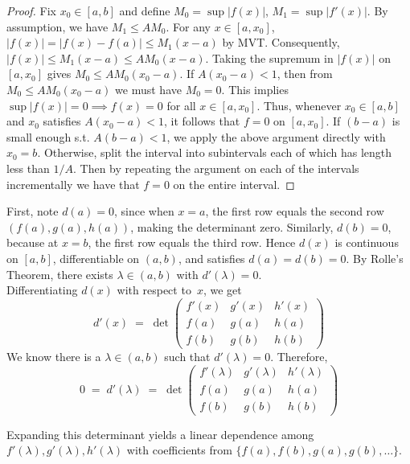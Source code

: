 \documentclass[11pt]{article}
\begin{document}
\begin{exercise}{5.26}
    \begin{proof}
        Fix $x_0 \in [a, b]$ and define $M_0 = \sup |f(x)|$, $M_1 = \sup |f'(x)|$. By assumption, we have $M_1 \le A M_0$. For any $x \in [a, x_0]$, $|f(x)| = |f(x) - f(a)| \le M_1(x - a)$ by MVT. Consequently, $|f(x)| \le M_1 (x - a) \le A M_0 (x - a)$. Taking the supremum in $|f(x)|$ on $[a, x_0]$ gives $M_0 \le AM_0 (x_0 - a)$. If $A(x_0 - a) < 1$, then from $M_0 \le A M_0(x_0 - a)$ we must have $M_0 = 0$. This implies $\sup |f(x)| = 0 \implies f(x) = 0$ for all $x \in [a, x_0]$. Thus, whenever $x_0 \in [a, b]$ and $x_0$ satisfies $A(x_0 - a) < 1$, it follows that $f = 0$ on $[a, x_0]$. If $(b -a)$ is small enough s.t. $A(b - a) < 1$, we apply the above argument directly with $x_0 = b$. Otherwise, split the interval into subintervals each of which has length less than $1/ A$. Then by repeating the argument on each of the intervals incrementally we have that $f = 0$ on the entire interval. 
    \end{proof}
\end{exercise}

\begin{exercise}{1}
    First, note $d(a)=0$, since when $x=a$, the first row equals the second row \((f(a), g(a), h(a))\), making the determinant zero. Similarly, $d(b)=0$, because at $x=b$, the first row equals the third row. Hence $d(x)$ is continuous on $[a,b]$, differentiable on $(a,b)$, and satisfies $d(a)=d(b)=0$. By Rolle's Theorem, there exists $\lambda \in (a,b)$ with $d'(\lambda)=0$. \\

    Differentiating $d(x)$ with respect to\ $x$,  we get
  \[
    d'(x) \;=\; \det\!\begin{pmatrix}
      f'(x) & g'(x) & h'(x)\\
      f(a)  & g(a)  & h(a)\\
      f(b)  & g(b)  & h(b)
    \end{pmatrix}
  \]
    We know there is a $\lambda\in (a,b)$ such that $d'(\lambda)=0$.  Therefore,
  \[
    0 
    \;=\;
    d'(\lambda)
    \;=\;
    \det\!\begin{pmatrix}
      f'(\lambda) & g'(\lambda) & h'(\lambda)\\
      f(a)        & g(a)        & h(a)\\
      f(b)        & g(b)        & h(b)
    \end{pmatrix}
  \]
\item Expanding this determinant yields a linear dependence among 
  $f'(\lambda), g'(\lambda), h'(\lambda)$ with coefficients from $\{f(a),f(b),g(a),g(b),\dots\}$.
\end{exercise}
\end{document}
